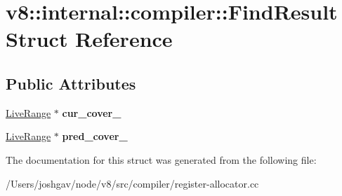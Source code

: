 \hypertarget{structv8_1_1internal_1_1compiler_1_1_find_result}{}\section{v8\+:\+:internal\+:\+:compiler\+:\+:Find\+Result Struct Reference}
\label{structv8_1_1internal_1_1compiler_1_1_find_result}
\subsection*{Public Attributes}
\begin{DoxyCompactItemize}
\item 
\hyperlink{classv8_1_1internal_1_1compiler_1_1_live_range}{Live\+Range} $\ast$ {\bfseries cur\+\_\+cover\+\_\+}\hypertarget{structv8_1_1internal_1_1compiler_1_1_find_result_a3c85d18e9f664f34c305a65d627c16b4}{}\label{structv8_1_1internal_1_1compiler_1_1_find_result_a3c85d18e9f664f34c305a65d627c16b4}

\item 
\hyperlink{classv8_1_1internal_1_1compiler_1_1_live_range}{Live\+Range} $\ast$ {\bfseries pred\+\_\+cover\+\_\+}\hypertarget{structv8_1_1internal_1_1compiler_1_1_find_result_a8a6009810ce4e54ac11dd460b86aca5e}{}\label{structv8_1_1internal_1_1compiler_1_1_find_result_a8a6009810ce4e54ac11dd460b86aca5e}

\end{DoxyCompactItemize}


The documentation for this struct was generated from the following file\+:\begin{DoxyCompactItemize}
\item 
/\+Users/joshgav/node/v8/src/compiler/register-\/allocator.\+cc\end{DoxyCompactItemize}
